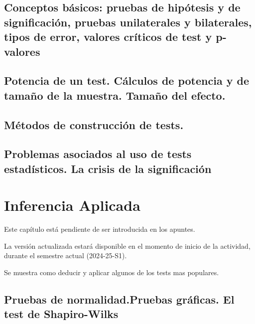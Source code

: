 \documentclass[
]{article}
\begin{document}
\subsection{Conceptos básicos: pruebas de hipótesis y de significación, pruebas unilaterales y bilaterales, tipos de error, valores críticos de test y p-valores}\label{conceptos-buxe1sicos-pruebas-de-hipuxf3tesis-y-de-significaciuxf3n-pruebas-unilaterales-y-bilaterales-tipos-de-error-valores-cruxedticos-de-test-y-p-valores}

\subsection{Potencia de un test. Cálculos de potencia y de tamaño de la muestra. Tamaño del efecto.}\label{potencia-de-un-test.-cuxe1lculos-de-potencia-y-de-tamauxf1o-de-la-muestra.-tamauxf1o-del-efecto.}

\subsection{Métodos de construcción de tests.}\label{muxe9todos-de-construcciuxf3n-de-tests.}

\subsection{Problemas asociados al uso de tests estadísticos. La crisis de la significación}\label{problemas-asociados-al-uso-de-tests-estaduxedsticos.-la-crisis-de-la-significaciuxf3n}

\section{Inferencia Aplicada}\label{inferencia-aplicada}

Este capítulo está pendiente de ser introducida en los apuntes.

La versión actualizada estará disponible en el momento de inicio de la actividad, durante el semestre actual (2024-25-S1).

Se muestra como deducir y aplicar algunos de los tests mas populares.

\subsection{Pruebas de normalidad.Pruebas gráficas. El test de Shapiro-Wilks}\label{pruebas-de-normalidad.pruebas-gruxe1ficas.-el-test-de-shapiro-wilks}
\end{document}
